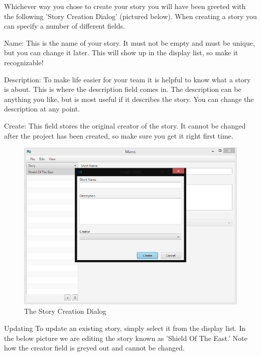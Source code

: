 Whichever way you chose to create your story you will have been greeted with the following 'Story Creation Dialog' (pictured below). When creating a story you can specify a number of different fields. 

Name:
This is the name of your story. It must not be empty and must be unique, but you can change it later. This will show up in the display list, so make it recognizable!

Description:
To make life easier for your team it is helpful to know what a story is about. This is where the description field comes in. The description can be anything you like, but is most useful if it describes the story. You can change the description at any point.

Create:
This field stores the original creator of the story. It cannot be changed after the project has been created, so make sure you get it right first time.

\begin{figure}[H]
\centering
\includegraphics[width=\textwidth]{images/screenshots/stories3.PNG}
\caption{The Story Creation Dialog}
\label{fig:new_project}
\end{figure}

Updating
To update an existing story, simply select it from the display list. In the below picture we are editing the story known as 'Shield Of The East.' Note how the creator field is greyed out and cannot be changed.

